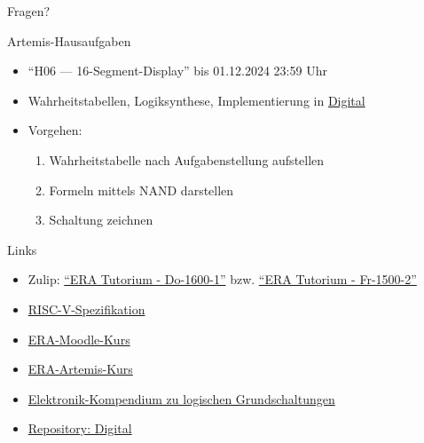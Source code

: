 \begin{frame}[c, fragile]{}{}
	\begin{center}
		\LARGE Fragen?
	\end{center}
\end{frame}

\begin{frame}[c, fragile]{Artemis-Hausaufgaben}{}
	\begin{itemize}
		\item \enquote{H06 --- 16-Segment-Display} bis 01.12.2024 23:59 Uhr
		\item Wahrheitstabellen, Logiksynthese, Implementierung in \href{https://github.com/hneemann/Digital}{Digital}
		\item Vorgehen: \begin{enumerate}
			      \item Wahrheitstabelle nach Aufgabenstellung aufstellen
			      \item Formeln mittels NAND darstellen
			      \item Schaltung zeichnen
		      \end{enumerate}
	\end{itemize}
\end{frame}

\begin{frame}[c, fragile]{Links}{}
	\begin{itemize}
		\item Zulip: \href{https://zulip.in.tum.de/#narrow/stream/2661-ERA-Tutorium---Do-1600-1}{\enquote{ERA Tutorium - Do-1600-1}}
		      bzw. \href{https://zulip.in.tum.de/#narrow/stream/2675-ERA-Tutorium---Fr-1500-2 }{\enquote{ERA Tutorium - Fr-1500-2}}
		\item \href{https://riscv.org/wp-content/uploads/2017/05/riscv-spec-v2.2.pdf}{RISC-V-Spezifikation}
		\item \href{https://www.moodle.tum.de/course/view.php?id=100633}{ERA-Moodle-Kurs}
		\item \href{https://artemis.in.tum.de/courses/401}{ERA-Artemis-Kurs}
		\item \href{https://www.elektronik-kompendium.de/sites/dig/2609191.htm}{Elektronik-Kompendium zu logischen Grundschaltungen}
		\item \href{https://github.com/hneemann/Digital}{Repository: Digital}
	\end{itemize}
\end{frame}

\maketitle


